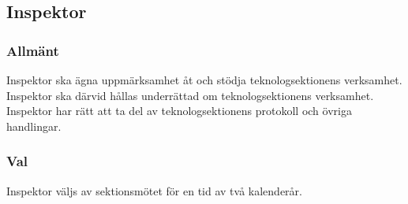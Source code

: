 \subsection{Inspektor}
\subsubsection{Allmänt}
Inspektor ska ägna uppmärksamhet åt och stödja teknologsektionens verksamhet. Inspektor ska därvid hållas underrättad om teknologsektionens verksamhet. Inspektor har rätt att ta del av teknologsektionens protokoll och övriga handlingar.
\subsubsection{Val}
Inspektor väljs av sektionsmötet för en tid av två kalenderår.

